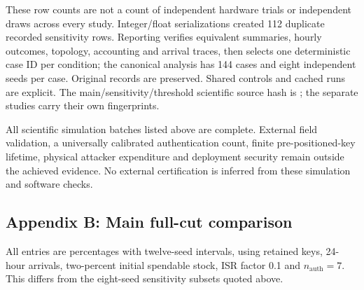 \documentclass[a4paper,11pt]{article}
\begin{document}
These row counts are not a count of independent hardware trials or independent draws across every study. Integer/float serializations created 112 duplicate recorded sensitivity rows. Reporting verifies equivalent summaries, hourly outcomes, topology, accounting and arrival traces, then selects one deterministic case ID per condition; the canonical analysis has 144 cases and eight independent seeds per case. Original records are preserved. Shared controls and cached runs are explicit. The main/sensitivity/threshold scientific source hash is ; the separate studies carry their own fingerprints.

All scientific simulation batches listed above are complete. External field validation, a universally calibrated authentication count, finite pre-positioned-key lifetime, physical attacker expenditure and deployment security remain outside the achieved evidence. No external certification is inferred from these simulation and software checks.

\clearpage\subsection{Appendix B: Main full-cut comparison}\label{appendix-b-main-full-cut-comparison}

All entries are percentages with twelve-seed intervals, using retained keys, 24-hour arrivals, two-percent initial spendable stock, ISR factor 0.1 and \(n_{\mathrm{auth}}=7\). This differs from the eight-seed sensitivity subsets quoted above.
\end{document}
